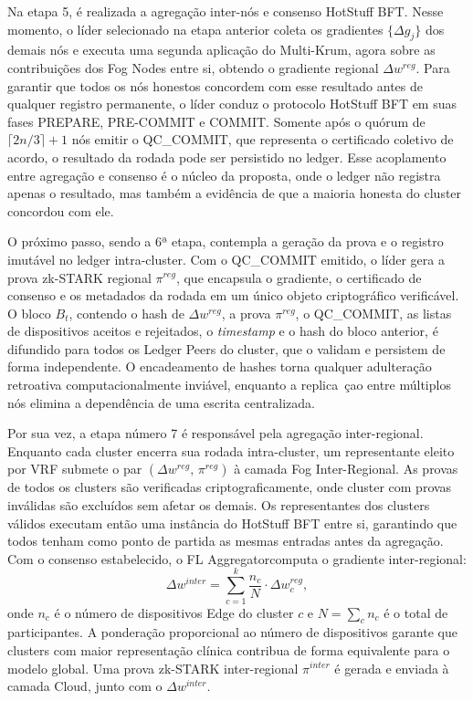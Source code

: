 \documentclass[12pt]{article}
\begin{document}
Na etapa 5, é realizada a agregação inter-nós e consenso HotStuff BFT. Nesse momento, o líder selecionado na etapa anterior coleta os gradientes $\{\Delta g_j\}$ dos demais nós e executa uma segunda aplicação do Multi-Krum, agora sobre as contribuições dos Fog Nodes entre si, obtendo o gradiente regional $\Delta w^{{reg}}$. Para garantir que todos os nós honestos concordem com esse resultado antes de qualquer registro permanente, o líder conduz o protocolo HotStuff BFT em suas fases PREPARE, PRE-COMMIT e COMMIT. Somente após o quórum de $\lceil 2n/3 \rceil + 1$ nós emitir o QC\_COMMIT, que representa o certificado coletivo de acordo, o resultado da rodada pode ser persistido no ledger. Esse acoplamento entre agregação e consenso é o núcleo da proposta, onde o ledger não registra apenas o resultado, mas também a evidência de que a maioria honesta do cluster concordou com ele.

O próximo passo, sendo a 6ª etapa, contempla a geração da prova e o registro imutável no ledger intra-cluster. Com o QC\_COMMIT emitido, o líder gera a prova zk-STARK regional $\pi^{{reg}}$, que encapsula o gradiente, o certificado de consenso e os metadados da rodada em um único objeto criptográfico verificável. O bloco $B_t$, contendo o hash de $\Delta w^{reg}$, a prova $\pi^{reg}$, o QC\_COMMIT, as listas de dispositivos aceitos e rejeitados, o \textit{timestamp} e o hash do bloco anterior, é difundido para todos os Ledger Peers do cluster, que o validam e persistem de forma independente. O encadeamento de hashes torna qualquer adulteração retroativa computacionalmente inviável, enquanto a replica~çao entre múltiplos nós elimina a dependência de uma escrita centralizada.

Por sua vez, a etapa número 7 é responsável pela agregação inter-regional. Enquanto cada cluster encerra sua rodada intra-cluster, um representante eleito por VRF submete o par $(\Delta w^{{reg}},\, \pi^{{reg}})$ à camada Fog Inter-Regional. As provas de todos os clusters são verificadas criptograficamente, onde cluster com provas inválidas são excluídos sem afetar os demais. Os representantes dos clusters válidos executam então uma instância do HotStuff BFT entre si, garantindo que todos tenham como ponto de partida as mesmas entradas antes da agregação. Com o consenso estabelecido, o FL Aggregatorcomputa o gradiente inter-regional:
\[
\Delta w^{{inter}} = \sum_{c=1}^{k} \frac{n_c}{N}
\cdot \Delta w_c^{{reg}},
\]
onde $n_c$ é o número de dispositivos Edge do cluster $c$ e $N = \sum_c n_c$ é o total de participantes. A ponderação proporcional ao número de dispositivos garante que clusters com maior representação clínica contribua de forma equivalente para o modelo global. Uma prova zk-STARK inter-regional $\pi^{inter}$ é gerada e enviada à camada Cloud, junto com o $\Delta w^{inter}$.
\end{document}
